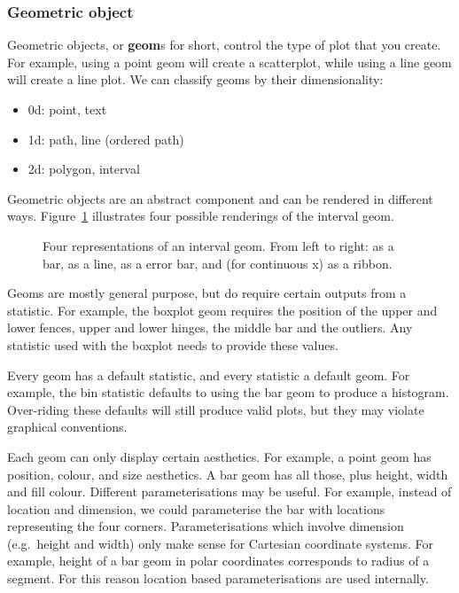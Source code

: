 \subsubsection{Geometric object}\label{sub:geometric-objects} 

Geometric objects, or {\bf geom}s for short, control the type of plot that you create.  For example, using a point geom will create a scatterplot, while using a line geom will create a line plot.  We can classify geoms by their dimensionality:

\begin{itemize}
	\item 0d: point, text
	\item 1d: path, line (ordered path)
	\item 2d: polygon, interval
\end{itemize}

Geometric objects are an abstract component and can be rendered in different ways. Figure~\ref{fig:interval} illustrates four possible renderings of the interval geom. 

\begin{figure}[htbp]
	\centering
	\caption{Four representations of an interval geom.  From left to right: as a bar, as a line, as a error bar, and (for continuous x) as a ribbon.}
	\label{fig:interval}
\end{figure}

Geoms are mostly general purpose, but do require certain outputs from a statistic.  For example, the boxplot geom requires the position of the upper and lower fences, upper and lower hinges, the middle bar and the outliers. Any statistic used with the boxplot needs to provide these values. 

Every geom has a default statistic, and every statistic a default geom.  For example, the bin statistic defaults to using the bar geom to produce a histogram.  Over-riding these defaults will still produce valid plots, but they may violate graphical conventions.

Each geom can only display certain aesthetics.  For example, a point geom has position, colour, and size aesthetics.  A bar geom has all those, plus height, width and fill colour.  Different parameterisations may be useful.  For example, instead of location and dimension, we could parameterise the bar with locations representing the four corners.  Parameterisations which involve dimension (e.g.\ height and width) only make sense for Cartesian coordinate systems.  For example, height of a bar geom in polar coordinates corresponds to radius of a segment.  For this reason location based parameterisations are used internally.  

